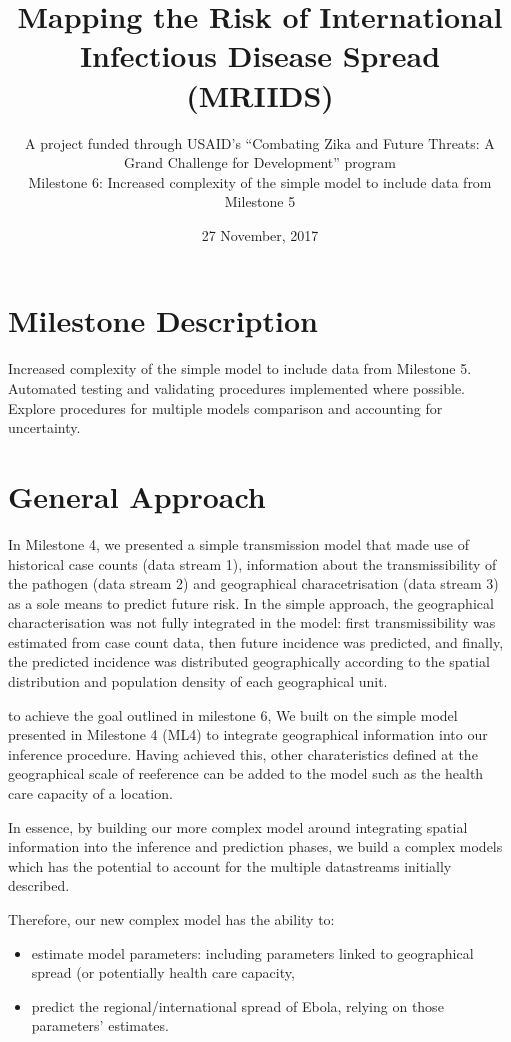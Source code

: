 \documentclass[11pt,]{article}
\title{Mapping the Risk of International Infectious Disease Spread
    (MRIIDS)}
\subtitle{A project funded through USAID’s ``Combating Zika and
    Future Threats: A Grand Challenge for Development'' program \\
    Milestone 6: Increased complexity of the simple model to include data from Milestone 5}
\author{}
\date{27 November, 2017}
\begin{document}
\maketitle
\tableofcontents

\newpage
\section{Milestone Description}\label{milestone-description}

Increased complexity of the simple model to include data from Milestone
5. Automated testing and validating procedures implemented where
possible. Explore procedures for multiple models comparison and accounting for
uncertainty.

\section{General Approach}
In Milestone 4, we presented a simple transmission model that made use of
historical case counts (data stream 1), information about the
transmissibility of the pathogen (data stream 2) and geographical
characetrisation (data stream 3) as a sole means to predict future risk. 
In the simple approach, the geographical characterisation was not fully integrated in the model:
first transmissibility was estimated from case count data, then future incidence was predicted, and 
finally, the predicted incidence was distributed geographically according to the spatial distribution 
and population density of each geographical unit.

to achieve the goal outlined in milestone 6, We built on the simple model presented in Milestone 4 
(ML4) to integrate geographical information into our inference procedure.
Having achieved this, other charateristics defined at the geographical scale of reeference can be 
added to the model such as the health care capacity of a location.

In essence, by building our more complex model around integrating spatial information 
into the inference and prediction phases, we build a complex models which has the potential to
account for the multiple datastreams initially described.

Therefore, our new complex model has the ability to:
\begin{itemize}
\item estimate model parameters: including parameters linked to geographical spread (or
potentially health care capacity,
\item predict the regional/international spread of Ebola, relying on those parameters' estimates. 
\end{itemize}
\end{document}
